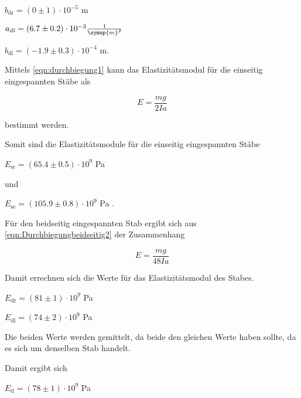 \centerline{$b_\text{dr} = (0 \pm 1) \cdot 10^{-5} $ m}
\vspace{1em}
\centerline{$a_\text{dl} = (6.7 \pm 0.2) \cdot 10^{-3} \frac{1}{\symup{m}^2} $}

\centerline{$b_\text{dl} = (-1.9 \pm 0.3) \cdot 10^{-4} $ m.}
\vspace{1em}

Mittels \eqref{eqn:durchbiegung1} kann das Elastizitätsmodul für die einseitig eingespannten Stäbe als

\begin{equation}
  E = \frac{m g}{2 I a}
\end{equation}

bestimmt werden.

Somit sind die Elastizitätsmodule für die einseitig eingespannten Stäbe

\vspace{.5em}
\centerline{$E_\text{sr} = (65.4 \pm 0.5) \cdot 10^9$ Pa}
\vspace{.5em}

und

\vspace{.5em}
\centerline{$E_\text{se} = (105.9 \pm 0.8) \cdot 10^9$ Pa .}
\vspace{.5em}

Für den beidseitig eingespannten Stab ergibt sich aus \eqref{eqn:Durchbiegungbeidseitig2} der Zusammenhang

\begin{equation}
  E = \frac{m g}{48 I a}
\end{equation}

Damit errechnen sich die Werte für das Elastizitätsmodul des Stabes.

\vspace{.5em}
\centerline{$E_\text{dr}  = (81 \pm 1) \cdot 10^9$ Pa}
\vspace{.5em}

\vspace{.5em}
\centerline{$E_\text{dl}  = (74 \pm 2) \cdot 10^9$ Pa}
\vspace{.5em}

Die beiden Werte werden gemittelt, da beide den gleichen Werte haben sollte, da es sich um denselben Stab handelt.

Damit ergibt sich

\vspace{.5em}
\centerline{$E_\text{d} = (78 \pm 1) \cdot 10^9$ Pa}
\vspace{.5em}

